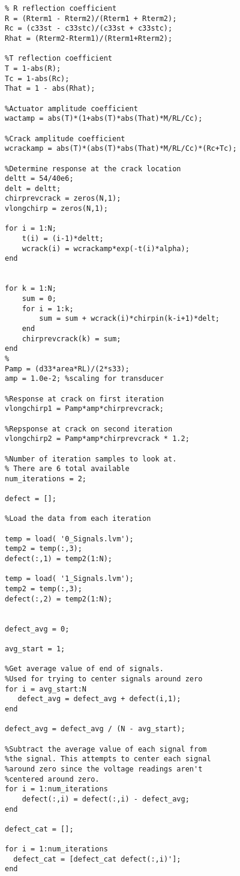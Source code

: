 \begin{lstlisting}
% R reflection coefficient
R = (Rterm1 - Rterm2)/(Rterm1 + Rterm2);
Rc = (c33st - c33stc)/(c33st + c33stc);
Rhat = (Rterm2-Rterm1)/(Rterm1+Rterm2);

%T reflection coefficient
T = 1-abs(R);
Tc = 1-abs(Rc);
That = 1 - abs(Rhat);

%Actuator amplitude coefficient
wactamp = abs(T)*(1+abs(T)*abs(That)*M/RL/Cc);

%Crack amplitude coefficient
wcrackamp = abs(T)*(abs(T)*abs(That)*M/RL/Cc)*(Rc+Tc);

%Determine response at the crack location
deltt = 54/40e6;
delt = deltt;
chirprevcrack = zeros(N,1);
vlongchirp = zeros(N,1);

for i = 1:N;
    t(i) = (i-1)*deltt;
    wcrack(i) = wcrackamp*exp(-t(i)*alpha);
end


for k = 1:N;
    sum = 0;
    for i = 1:k;
        sum = sum + wcrack(i)*chirpin(k-i+1)*delt;
    end
    chirprevcrack(k) = sum;
end
%
Pamp = (d33*area*RL)/(2*s33);
amp = 1.0e-2; %scaling for transducer

%Response at crack on first iteration
vlongchirp1 = Pamp*amp*chirprevcrack;

%Repsponse at crack on second iteration
vlongchirp2 = Pamp*amp*chirprevcrack * 1.2;

%Number of iteration samples to look at.
% There are 6 total available
num_iterations = 2;

defect = [];

%Load the data from each iteration
    
temp = load( '0_Signals.lvm');
temp2 = temp(:,3);
defect(:,1) = temp2(1:N);

temp = load( '1_Signals.lvm');
temp2 = temp(:,3);
defect(:,2) = temp2(1:N);


defect_avg = 0;

avg_start = 1;

%Get average value of end of signals. 
%Used for trying to center signals around zero
for i = avg_start:N
   defect_avg = defect_avg + defect(i,1);
end

defect_avg = defect_avg / (N - avg_start);

%Subtract the average value of each signal from
%the signal. This attempts to center each signal 
%around zero since the voltage readings aren't
%centered around zero.
for i = 1:num_iterations
    defect(:,i) = defect(:,i) - defect_avg; 
end

defect_cat = [];

for i = 1:num_iterations
  defect_cat = [defect_cat defect(:,i)'];
end


\end{lstlisting}

